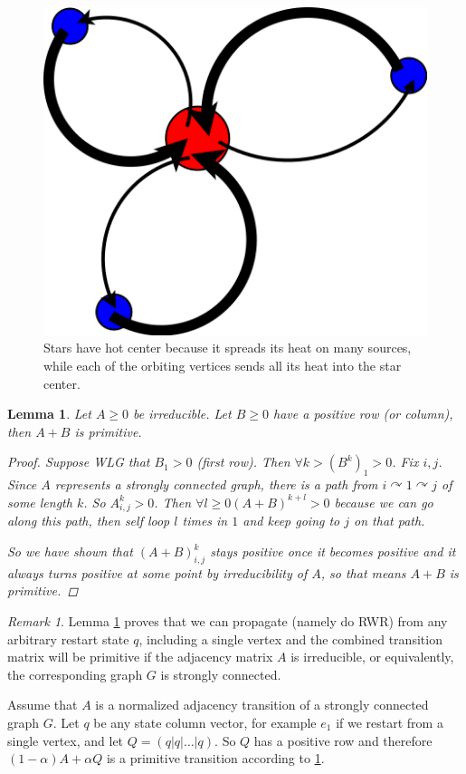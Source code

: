 \documentclass[a4paper,10pt]{article}
\newcommand{\gt}{>}
\theoremstyle{definition}
\theoremstyle{remark}
\newtheorem{remark}{Remark}
\theoremstyle{plain}
\newtheorem{lemma}{Lemma}[section]
\begin{document}

\begin{figure}[!htb]
\begin{framed}
\centering
\includegraphics[width=0.55\linewidth]{diagram_star.png}
\caption{Stars have hot center because it spreads its heat on many sources,
while each of the orbiting vertices sends all its heat into the star center.
}
\label{fig:hotstar}
\end{framed}
\end{figure}

\begin{lemma}
\label{lem:AplusP}
Let $A \geq 0$ be irreducible. Let $B \geq 0$ have a positive row (or column),
then $A + B$ is primitive.
\begin{proof}
Suppose WLG that $B_1 > 0$ (first row). Then $\forall k \gt (B^k)_1 \gt 0$.
Fix $i,j$.
Since $A$ represents a strongly connected graph, there is a path from $i
\curvearrowright 1 \curvearrowright j$ of some length $k$. So $A^k_{i,j}>0$.
Then $\forall l \geq 0 (A + B)^{k+l} \gt 0$ because we can go along this path,
then self loop $l$ times in $1$ and keep going to $j$ on that path.

So we have shown that $(A+B)^k_{i,j}$ stays positive once it becomes positive
and it always turns positive at some point by irreducibility of $A$, so that
means $A+B$ is primitive.
\end{proof}
\end{lemma}

\begin{remark}
\label{rem:AplusP}
Lemma \ref{lem:AplusP} proves that we can propagate (namely do RWR) from any arbitrary restart
state $q$, including a single vertex and the combined transition matrix will be
primitive if the adjacency matrix $A$ is irreducible, or
equivalently, the corresponding graph $G$ is strongly connected.


Assume that $A$ is a normalized adjacency transition of a strongly
connected graph $G$.
Let $q$ be any state column vector, for example $e_1$ if we restart
from a single vertex, and let $Q = (q | q | \dots | q)$.
So $Q$ has a positive row and therefore $(1-\alpha)A + \alpha Q$ is a primitive
transition according to \ref{lem:AplusP}.

\end{remark}
\end{document}
